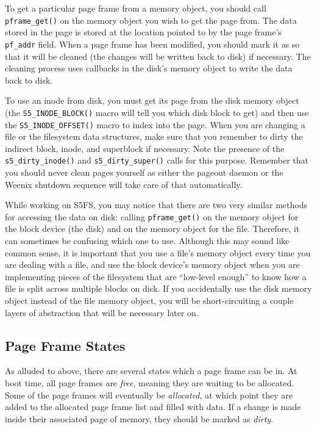 To get a particular page frame from a memory object, you should call \texttt{pframe\_get()} on the memory object you wish to get the page from. The data stored in the page is stored at the location pointed to by the page frame's \texttt{pf\_addr} field. When a page frame has been modified, you should mark it as  so that it will be cleaned (the changes will be written back to disk) if necessary. The cleaning process uses callbacks in the disk's memory object to write the data back to disk.

To use an inode from disk, you must get its page from the disk memory object (the \texttt{S5\_INODE\_BLOCK()} macro will tell you which disk block to get) and then use the \texttt{S5\_INODE\_OFFSET()} macro to index into the page. When you are changing a file or the filesystem data structures, make sure that you remember to dirty the indirect block, inode, and superblock if necessary. Note the presence of the \texttt{s5\_dirty\_inode()} and \texttt{s5\_dirty\_super()} calls for this purpose. Remember that you should never clean pages yourself as either the pageout daemon or the Weenix shutdown sequence will take care of that automatically.

While working on S5FS, you may notice that there are two very similar methods for accessing the data on disk: calling \texttt{pframe\_get()} on the memory object for the block device (the disk) and on the memory object for the file. Therefore, it can sometimes be confusing which one to use. Although this may sound like common sense, it is important that you use a file's memory object every time you are dealing with a file, and use the block device's memory object when you are implementing pieces of the filesystem that are ``low-level enough'' to know how a file is split across multiple blocks on disk. If you accidentally use the disk memory object instead of the file memory object, you will be short-circuiting a couple layers of abstraction that will be necessary later on.

\subsection{Page Frame States} \label{pf-states}

As alluded to above, there are several states which a page frame can be in. At boot time, all page frames are \emph{free}, meaning they are waiting to be allocated. Some of the page frames will eventually be \emph{allocated}, at which point they are added to the allocated page frame list and filled with data. If a change is made inside their associated page of memory, they should be marked as \emph{dirty}.

